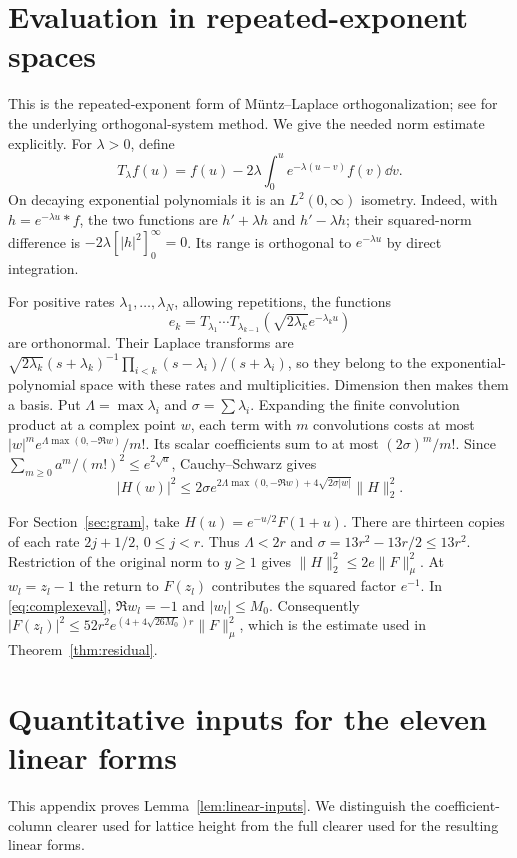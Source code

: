 \section{Evaluation in repeated-exponent spaces}\label{app:evaluation}
This is the repeated-exponent form of M\"untz--Laplace orthogonalization;
see \cite[Section~2]{BEZ} for the underlying orthogonal-system method.
We give the needed norm estimate explicitly.
For $\lambda>0$, define
\[
 T_\lambda f(u)=f(u)-2\lambda\int_0^ue^{-\lambda(u-v)}f(v)\dd v.
\]
On decaying exponential polynomials it is an $L^2(0,\infty)$ isometry.
Indeed, with $h=e^{-\lambda u}*f$, the two functions are
$h'+\lambda h$ and $h'-\lambda h$; their squared-norm difference is
$-2\lambda[|h|^2]_0^\infty=0$. Its range is orthogonal to
$e^{-\lambda u}$ by direct integration.

For positive rates $\lambda_1,\ldots,\lambda_N$, allowing repetitions,
the functions
\[
 e_k=T_{\lambda_1}\cdots T_{\lambda_{k-1}}
                         (\sqrt{2\lambda_k}e^{-\lambda_ku})
\]
are orthonormal. Their Laplace transforms are
$\sqrt{2\lambda_k}(s+\lambda_k)^{-1}
\prod_{i<k}(s-\lambda_i)/(s+\lambda_i)$, so they belong to the
exponential-polynomial space with these rates and multiplicities.
Dimension then makes them a basis. Put $\Lambda=\max\lambda_i$
and $\sigma=\sum\lambda_i$. Expanding the finite convolution product
at a complex point $w$, each term with $m$ convolutions costs at most
$|w|^m e^{\Lambda\max(0,-\Re w)}/m!$. Its scalar coefficients sum
to at most $(2\sigma)^m/m!$. Since
$\sum_{m\geq0}a^m/(m!)^2\leq e^{2\sqrt a}$,
Cauchy--Schwarz gives
\begin{equation}\label{eq:complexeval}
 |H(w)|^2\leq2\sigma
 e^{2\Lambda\max(0,-\Re w)+4\sqrt{2\sigma|w|}}\|H\|_2^2.
\end{equation}

For Section~\ref{sec:gram}, take $H(u)=e^{-u/2}F(1+u)$.
There are thirteen copies of each rate $2j+1/2$, $0\leq j<r$.
Thus $\Lambda<2r$ and $\sigma=13r^2-13r/2\leq13r^2$.
Restriction of the original norm to $y\geq1$ gives
$\|H\|_2^2\leq2e\|F\|_\mu^2$.
At $w_l=z_l-1$ the return to $F(z_l)$ contributes the squared
factor $e^{-1}$. In \eqref{eq:complexeval}, $\Re w_l=-1$ and
$|w_l|\leq M_0$. Consequently
$|F(z_l)|^2\leq52r^2e^{(4+4\sqrt{26M_0})r}\|F\|_\mu^2$,
which is the estimate used in Theorem~\ref{thm:residual}.

\section{Quantitative inputs for the eleven linear forms}\label{app:linear-inputs}
This appendix proves Lemma~\ref{lem:linear-inputs}. We distinguish the
coefficient-column clearer used for lattice height from the full
clearer used for the resulting linear forms.

